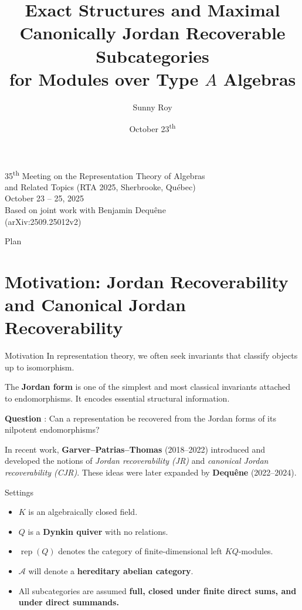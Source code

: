 \documentclass[t]{beamer}
\title{Exact Structures and Maximal Canonically Jordan Recoverable Subcategories\\for Modules over Type \(A\) Algebras}
\author{Sunny Roy}
\institute{Département de mathématiques, Université de Sherbrooke}
\date{October 23\textsuperscript{th}}
\theoremstyle{plain}
\newcommand{\rep}{\operatorname{rep}}
\begin{document}




\begin{frame}
  \titlepage
  \centering

  35\textsuperscript{th} Meeting on the Representation Theory of Algebras\\
  and Related Topics (RTA 2025, Sherbrooke, Québec)\\
  October 23 – 25, 2025\\[1em]
  \vfill
  \small
  Based on joint work with Benjamin Dequêne\\
  (arXiv:2509.25012v2)
\end{frame}
\begin{frame}{Plan}
  \tableofcontents[pausesections]
\end{frame}

\section{Motivation: Jordan Recoverability and Canonical Jordan Recoverability}
\begin{frame}{Motivation}
  In representation theory, we often seek invariants that classify objects
  up to isomorphism.

\pause

  \medskip
  The \textbf{Jordan form} is one of the simplest and most classical invariants
  attached to endomorphisms. It encodes essential structural information.

\pause
  \medskip

   \textbf{Question} : Can a representation be recovered from the Jordan forms of its nilpotent endomorphisms?
\pause

  \medskip
 In recent work, \textbf{Garver–Patrias–Thomas} (2018–2022)
introduced and developed the notions of
\emph{Jordan recoverability (JR)} and
\emph{canonical Jordan recoverability (CJR)}.
These ideas were later expanded by \textbf{Dequêne} (2022–2024).
\end{frame}

\begin{frame}{Settings}

\begin{itemize}
  \item[\large$\bullet$] $K$ is an algebraically closed field.
  \pause
  \item[\large$\bullet$] $Q$ is a \textbf{Dynkin quiver} with no relations.
  \pause
  \item[\large$\bullet$] $\rep(Q)$ denotes the category of finite-dimensional left $KQ$-modules.
  \pause
  \item[\large$\bullet$] $\mathscr{A}$ will denote a \textbf{hereditary abelian category}.
  \pause
  \item[\large$\bullet$] All subcategories are assumed \textbf{full, closed under finite direct sums, and under direct summands.}
\end{itemize}

\end{frame}
\end{document}
